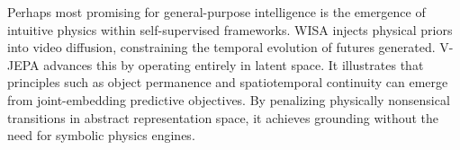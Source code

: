 \documentclass[pdflatex,sn-mathphys-num]{sn-jnl}
\theoremstyle{thmstyleone}%
\theoremstyle{thmstyletwo}%
\theoremstyle{thmstylethree}%
\begin{document}

Perhaps most promising for general-purpose intelligence is the emergence of intuitive physics within self-supervised frameworks. WISA \citep{wang2025wisa} injects physical priors into video diffusion, constraining the temporal evolution of futures generated. V-JEPA \citep{garrido2025intuitive} advances this by operating entirely in latent space. It illustrates that principles such as object permanence and spatiotemporal continuity can emerge from joint-embedding predictive objectives. By penalizing physically nonsensical transitions in abstract representation space, it achieves grounding without the need for symbolic physics engines.


\end{document}

